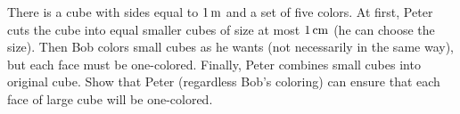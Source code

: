 \problem{}
There is a cube with sides equal to $1 \text{\,m}$ and a set of five colors.
At first, Peter cuts the cube into equal smaller cubes of size at most $1 \text{\,cm}$
(he can choose the size).
Then Bob colors small cubes as he wants (not necessarily in the same way), but each face must be 	
one-colored.
Finally, Peter combines small cubes into original cube.
Show that Peter (regardless Bob's coloring)  can ensure that each face of large cube will be 	
one-colored. 

\solution

\endproblem

